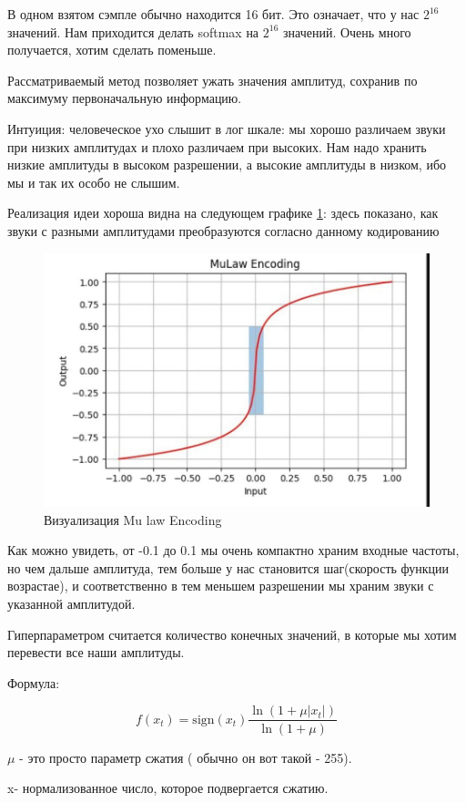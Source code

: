 	
	
	В одном взятом сэмпле обычно находится 16 бит. Это означает, что у нас $2^{16}$ значений. Нам приходится делать softmax на $2^{16}$ значений. Очень много получается, хотим сделать поменьше. 
	
	Рассматриваемый метод позволяет ужать значения амплитуд, сохранив по максимуму первоначальную информацию. 
	
	Интуиция: человеческое ухо слышит в лог шкале: мы хорошо различаем звуки при низких амплитудах и плохо различаем при высоких. Нам надо хранить низкие амплитуды в высоком разрешении, а высокие амплитуды в низком, ибо мы и так их особо не слышим. 
	
	Реализация идеи хороша видна на следующем графике \ref{fig:12_plot}: здесь показано, как звуки с разными амплитудами преобразуются согласно данному кодированию 
	
	
		\begin{figure}[H]
\centering
\includegraphics[width=0.7\linewidth]{12_trans.jpg}
\caption{Визуализация Mu law Encoding}
\label{fig:12_plot}
\end{figure}

Как можно увидеть, от -0.1 до 0.1 мы очень компактно храним входные частоты, но чем дальше амплитуда, тем больше у нас становится шаг(скорость функции возрастае), и соответственно в тем меньшем разрешении мы храним звуки с указанной амплитудой. 

Гиперпараметром считается количество конечных значений, в которые мы хотим перевести все наши амплитуды. 


Формула:

\begin{equation}
	    f(x_t) = \text{sign}(x_t) \dfrac{\ln(1+\mu|x_t|)}{\ln(1+\mu)}
	    \label{eq:12_formula}
\end{equation}
	
$\mu$ - это просто параметр сжатия ( обычно он вот такой - 255). 

x- нормализованное число, которое подвергается сжатию. 
